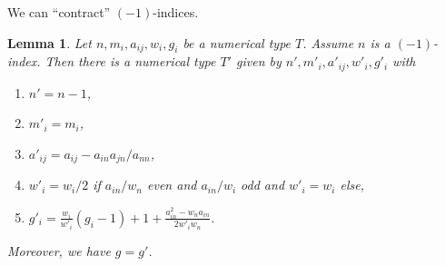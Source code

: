 \documentclass[10pt,a4paper]{amsart}
\theoremstyle{plain}
\newtheorem{lemma}[subsection]{Lemma}
\theoremstyle{definition}
\theoremstyle{remark}
\numberwithin{equation}{subsection}
\begin{document}
\noindent
We can ``contract'' $(-1)$-indices.

\begin{lemma}
\label{lemma-contract}
Let $n, m_i, a_{ij}, w_i, g_i$ be a numerical type $T$.
Assume $n$ is a $(-1)$-index. Then there is a numerical
type $T'$ given by $n', m'_i, a'_{ij}, w'_i, g'_i$ with
\begin{enumerate}
\item $n' = n - 1$,
\item $m'_i = m_i$,
\item $a'_{ij} = a_{ij} - a_{in}a_{jn}/a_{nn}$,
\item $w'_i = w_i/2$ if $a_{in}/w_n$ even and $a_{in}/w_i$ odd
and $w'_i = w_i$ else,
\item $g'_i =
\frac{w_i}{w'_i}(g_i - 1) + 1 + \frac{a_{in}^2 - w_na_{in}}{2w'_iw_n}$.
\end{enumerate}
Moreover, we have $g = g'$.
\end{lemma}
\end{document}
